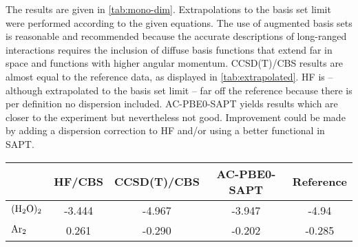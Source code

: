 \documentclass[a4paper,12pt]{scrartcl}
\begin{document}
%
The results are given in \autoref{tab:mono-dim}. Extrapolations to the basis set limit were performed according to the given equations. The use of augmented basis sets is reasonable and recommended because the accurate descriptions of long-ranged interactions requires the inclusion of diffuse basis functions that extend far in space and functions with higher angular momentum. CCSD(T)/CBS results are almost equal to the reference data, as displayed in \autoref{tab:extrapolated}. HF is -- although extrapolated to the basis set limit -- far off the reference because there is per definition no dispersion included. AC-PBE0-SAPT yields results which are closer to the experiment but nevertheless not good. Improvement could be made by adding a dispersion correction to HF and/or using a better functional in SAPT.
%
\begin{table}
	\centering
	\label{tab:extrapolated}
	\begin{tabular}{l|cccc}
		\toprule
		                & HF/CBS & CCSD(T)/CBS & AC-PBE0-SAPT & Reference                               \\
		\midrule
		$ \ce{(H2O)2} $ & -3.444 & -4.967      & -3.947       & -4.94\autocite[]{schutz1997water}       \\
		$ \ce{Ar2} $    & 0.261  & -0.290      & -0.202       & -0.285\autocite[]{podeszwa2005accurate} \\
		\bottomrule
	\end{tabular}
\end{table}
%
\end{document}

